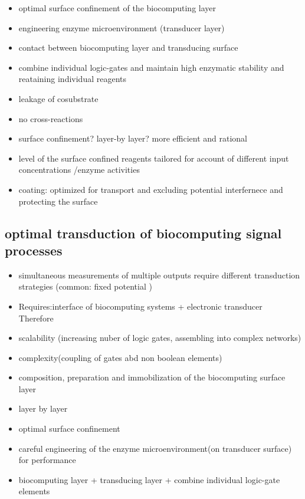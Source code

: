 \documentclass[runningheads]{llncs}
\begin{document}
	\begin{itemize}
		\item optimal surface confinement of the biocomputing layer
		\item engineering enzyme microenvironment (transducer layer)
		\item contact between biocomputing layer and transducing surface
		\item combine individual logic-gates and maintain high enzymatic stability and reataining individual reagents
		\item leakage of cosubstrate 
		\item no cross-reactions
		\item surface confinement? layer-by layer? more efficient and rational 
		\item level of the surface confined reagents tailored for account of different input concentrations /enzyme activities 
		\item coating: optimized for transport and excluding potential interfernece and protecting the surface
	\end{itemize}

\subsection{optimal transduction of biocomputing signal processes}
	\begin{itemize}
		\item simultaneous measurements of multiple outputs require different transduction strategies (common: fixed potential )
	\end{itemize}
	\begin{itemize}
		\item Requires:interface of biocomputing systems + electronic transducer\\
		Therefore
		\item scalability (increasing nuber of logic gates, assembling into complex networks)
		\item complexity(coupling of gates abd non boolean elements)
		\item composition, preparation and immobilization of the biocomputing surface layer
		\item layer by layer
		\item optimal surface confinement 
		\item careful engineering of the enzyme microenvironment(on transducer surface) for performance
		\item biocomputing layer + transducing layer + combine individual logic-gate elements	
	\end{itemize}
\end{document}
